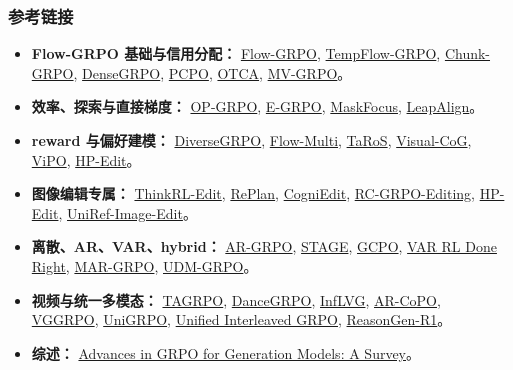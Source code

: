 \subsubsection{参考链接}

\begin{itemize}[leftmargin=1.5em]
  \item \textbf{Flow-GRPO 基础与信用分配：}
  \href{https://arxiv.org/abs/2505.05470}{Flow-GRPO},
  \href{https://arxiv.org/abs/2508.04324}{TempFlow-GRPO},
  \href{https://arxiv.org/abs/2510.21583}{Chunk-GRPO},
  \href{https://arxiv.org/abs/2601.20218}{DenseGRPO},
  \href{https://arxiv.org/abs/2509.25774}{PCPO},
  \href{https://arxiv.org/abs/2604.19234}{OTCA},
  \href{https://arxiv.org/abs/2603.12648}{MV-GRPO}。
  \item \textbf{效率、探索与直接梯度：}
  \href{https://arxiv.org/abs/2604.04142}{OP-GRPO},
  \href{https://arxiv.org/abs/2601.00423}{E-GRPO},
  \href{https://arxiv.org/abs/2512.18766}{MaskFocus},
  \href{https://arxiv.org/abs/2604.15311}{LeapAlign}。
  \item \textbf{reward 与偏好建模：}
  \href{https://arxiv.org/abs/2512.21514}{DiverseGRPO},
  \href{https://www.mdpi.com/1424-8220/26/4/1120}{Flow-Multi},
  \href{https://arxiv.org/abs/2511.19356}{TaRoS},
  \href{https://arxiv.org/abs/2508.18032}{Visual-CoG},
  \href{https://arxiv.org/abs/2511.18719}{ViPO},
  \href{https://arxiv.org/abs/2604.19406}{HP-Edit}。
  \item \textbf{图像编辑专属：}
  \href{https://arxiv.org/abs/2601.03467}{ThinkRL-Edit},
  \href{https://arxiv.org/abs/2512.16864}{RePlan},
  \href{https://arxiv.org/abs/2512.13276}{CogniEdit},
  \href{https://arxiv.org/abs/2604.09386}{RC-GRPO-Editing},
  \href{https://arxiv.org/abs/2604.19406}{HP-Edit},
  \href{https://arxiv.org/abs/2602.14186}{UniRef-Image-Edit}。
  \item \textbf{离散、AR、VAR、hybrid：}
  \href{https://arxiv.org/abs/2508.06924}{AR-GRPO},
  \href{https://arxiv.org/abs/2509.25027}{STAGE},
  \href{https://arxiv.org/abs/2509.22485}{GCPO},
  \href{https://arxiv.org/abs/2601.02256}{VAR RL Done Right},
  \href{https://arxiv.org/abs/2604.06966}{MAR-GRPO},
  \href{https://arxiv.org/abs/2604.18518}{UDM-GRPO}。
  \item \textbf{视频与统一多模态：}
  \href{https://arxiv.org/abs/2601.05729}{TAGRPO},
  \href{https://arxiv.org/abs/2505.07818}{DanceGRPO},
  \href{https://arxiv.org/abs/2505.17574}{InfLVG},
  \href{https://arxiv.org/abs/2603.17461}{AR-CoPO},
  \href{https://arxiv.org/abs/2603.26599}{VGGRPO},
  \href{https://arxiv.org/abs/2603.23500}{UniGRPO},
  \href{https://arxiv.org/abs/2603.09538}{Unified Interleaved GRPO},
  \href{https://arxiv.org/abs/2505.24875}{ReasonGen-R1}。
  \item \textbf{综述：}
  \href{https://arxiv.org/abs/2603.06623}{Advances in GRPO for Generation Models: A Survey}。
\end{itemize}
